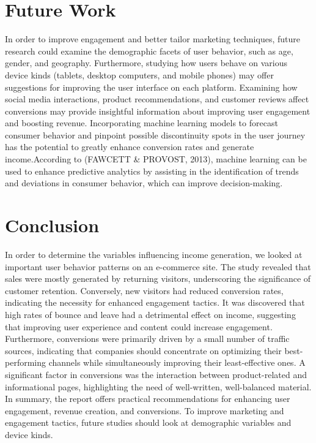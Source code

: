 \documentclass[12pt]{article}
\begin{document}
\section{Future Work}

In order to improve engagement and better tailor marketing techniques, future research could examine the demographic facets of user behavior, such as age, gender, and geography. Furthermore, studying how users behave on various device kinds (tablets, desktop computers, and mobile phones) may offer suggestions for improving the user interface on each platform. Examining how social media interactions, product recommendations, and customer reviews affect conversions may provide insightful information about improving user engagement and boosting revenue. Incorporating machine learning models to forecast consumer behavior and pinpoint possible discontinuity spots in the user journey has the potential to greatly enhance conversion rates and generate income.According to (FAWCETT & PROVOST, 2013), machine learning can be used to enhance predictive analytics by assisting in the identification of trends and deviations in consumer behavior, which can improve decision-making.

\section{Conclusion}

In order to determine the variables influencing income generation, we looked at important user behavior patterns on an e-commerce site. The study revealed that sales were mostly generated by returning visitors, underscoring the significance of customer retention. Conversely, new visitors had reduced conversion rates, indicating the necessity for enhanced engagement tactics. It was discovered that high rates of bounce and leave had a detrimental effect on income, suggesting that improving user experience and content could increase engagement.
Furthermore, conversions were primarily driven by a small number of traffic sources, indicating that companies should concentrate on optimizing their best-performing channels while simultaneously improving their least-effective ones. A significant factor in conversions was the interaction between product-related and informational pages, highlighting the need of well-written, well-balanced material. In summary, the report offers practical recommendations for enhancing user engagement, revenue creation, and conversions. To improve marketing and engagement tactics, future studies should look at demographic variables and device kinds.
\end{document}
